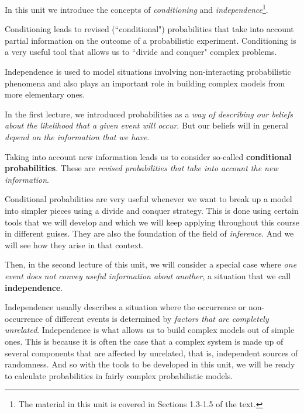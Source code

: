 \documentclass[pdftex, brazil, 12pt, twoside]{article}
\begin{document}
In this unit we introduce the concepts of \emph{conditioning} and
\emph{independence}\footnote{The material in this unit is covered in
  Sections 1.3-1.5 of the text.}.

Conditioning leads to revised (“conditional") probabilities that take into account
partial information on the outcome of a probabilistic experiment. Conditioning
is a very useful tool that allows us to “divide and conquer" complex problems.

Independence is used to model situations involving non-interacting probabilistic
phenomena and also plays an important role in building complex models from more
elementary ones.

In the first lecture, we introduced probabilities as a
\emph{way of describing our beliefs about the likelihood that a
given event will occur}.
But our beliefs will in general \emph{depend on the
information that we have}.

Taking into account new information leads us to
consider so-called \textbf{conditional probabilities}.
These are \emph{revised probabilities that take into
account the new information}.

Conditional probabilities are very useful whenever we want
to break up a model into simpler pieces using a divide
and conquer strategy.
This is done using certain tools that we will develop and
which we will keep applying throughout this course in
different guises.
They are also the foundation of the field of \emph{inference}.
And we will see how they arise in that context.

Then, in the second lecture of this unit, we will consider a
special case where \emph{one event does not convey useful
information about another}, a situation that we call
\textbf{independence}.

Independence usually describes a situation where the
occurrence or non-occurrence of different events is
determined by \emph{factors that are completely unrelated}.
Independence is what allows us to build complex models out of
simple ones.
This is because it is often the case that a complex system
is made up of several components that are affected
by unrelated, that is, independent sources of
randomness.
And so with the tools to be developed in this unit, we
will be ready to calculate probabilities in fairly
complex probabilistic models.

\begin{figure}[H]
  \begin{center}
  \end{center}
\end{figure}
\end{document}
